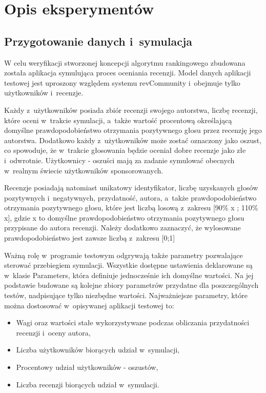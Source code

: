 \section{Opis eksperymentów}

\subsection{Przygotowanie danych i~symulacja}

W celu weryfikacji stworzonej koncepcji algorytmu rankingowego zbudowana została aplikacja symulująca proces oceniania recenzji. Model danych aplikacji testowej jest uproszony względem systemu revCommunity i~obejmuje tylko użytkowników i~recenzje. 

Każdy z~użytkowników posiada zbiór recenzji swojego autorstwa, liczbę recenzji, które oceni w~trakcie symulacji, a~także wartość procentową określającą  domyślne prawdopodobieństwo otrzymania pozytywnego głosu przez recenzję jego autorstwa. Dodatkowo każdy z~użytkowników może zostać oznaczony jako oszust, co spowoduje, że w~trakcie głosowania będzie oceniał dobre recenzje jako złe i~odwrotnie. Użytkownicy - oszuści mają za zadanie symulować obecnych w~realnym świecie użytkowników sponsorowanych.

Recenzje posiadają natomiast unikatowy identyfikator, liczbę uzyskanych głosów pozytywnych i~negatywnych, przydatność, autora, a~także prawdopodobieństwo otrzymania pozytywnego głosu, które jest liczbą losową z~zakresu [90\% x ; 110\% x], gdzie x to domyślne prawdopodobieństwo otrzymania pozytywnego głosu przypisane do autora recenzji. Należy dodatkowo zaznaczyć, że wylosowane prawdopodobieństwo jest zawsze liczbą z~zakresu [0;1]

Ważną rolę w~programie testowym odgrywają także parametry pozwalające sterować przebiegiem symulacji. Wszystkie dostępne ustawienia deklarowane są w~klasie Parameters, która definiuje jednocześnie ich domyślne wartości. Na jej podstawie budowane są kolejne zbiory parametrów przydatne dla poszczególnych testów, nadpisujące tylko niezbędne wartości. Najważniejsze parametry, które można dostosować w~opisywanej aplikacji testowej to:

\begin{itemize}
\item Wagi oraz wartości stałe wykorzystywane podczas obliczania przydatności recenzji i~oceny autora,
\item Liczba użytkowników biorących udział w~symulacji,
\item Procentowy udział użytkowników - oszustów,
\item Liczba recenzji biorących udział w~symulacji.
\end{itemize}



